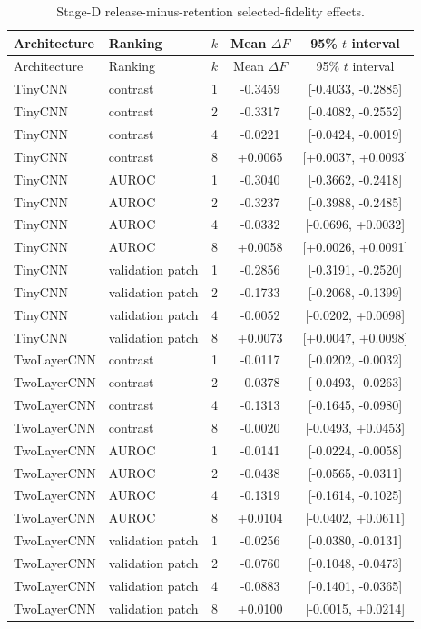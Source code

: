 {
\small
\setlength{\tabcolsep}{4pt}
\begin{longtable}{llrcc}
\caption{Stage-D release-minus-retention selected-fidelity effects.}\label{tab:stage-d-full}\\
\toprule
Architecture & Ranking & $k$ & Mean $\Delta F$ & 95\% $t$ interval \\
\midrule
\endfirsthead
\toprule
Architecture & Ranking & $k$ & Mean $\Delta F$ & 95\% $t$ interval \\
\midrule
\endhead
\bottomrule
\endfoot
TinyCNN & contrast & 1 & -0.3459 & [-0.4033, -0.2885] \\
TinyCNN & contrast & 2 & -0.3317 & [-0.4082, -0.2552] \\
TinyCNN & contrast & 4 & -0.0221 & [-0.0424, -0.0019] \\
TinyCNN & contrast & 8 & +0.0065 & [+0.0037, +0.0093] \\
TinyCNN & AUROC & 1 & -0.3040 & [-0.3662, -0.2418] \\
TinyCNN & AUROC & 2 & -0.3237 & [-0.3988, -0.2485] \\
TinyCNN & AUROC & 4 & -0.0332 & [-0.0696, +0.0032] \\
TinyCNN & AUROC & 8 & +0.0058 & [+0.0026, +0.0091] \\
TinyCNN & validation patch & 1 & -0.2856 & [-0.3191, -0.2520] \\
TinyCNN & validation patch & 2 & -0.1733 & [-0.2068, -0.1399] \\
TinyCNN & validation patch & 4 & -0.0052 & [-0.0202, +0.0098] \\
TinyCNN & validation patch & 8 & +0.0073 & [+0.0047, +0.0098] \\
TwoLayerCNN & contrast & 1 & -0.0117 & [-0.0202, -0.0032] \\
TwoLayerCNN & contrast & 2 & -0.0378 & [-0.0493, -0.0263] \\
TwoLayerCNN & contrast & 4 & -0.1313 & [-0.1645, -0.0980] \\
TwoLayerCNN & contrast & 8 & -0.0020 & [-0.0493, +0.0453] \\
TwoLayerCNN & AUROC & 1 & -0.0141 & [-0.0224, -0.0058] \\
TwoLayerCNN & AUROC & 2 & -0.0438 & [-0.0565, -0.0311] \\
TwoLayerCNN & AUROC & 4 & -0.1319 & [-0.1614, -0.1025] \\
TwoLayerCNN & AUROC & 8 & +0.0104 & [-0.0402, +0.0611] \\
TwoLayerCNN & validation patch & 1 & -0.0256 & [-0.0380, -0.0131] \\
TwoLayerCNN & validation patch & 2 & -0.0760 & [-0.1048, -0.0473] \\
TwoLayerCNN & validation patch & 4 & -0.0883 & [-0.1401, -0.0365] \\
TwoLayerCNN & validation patch & 8 & +0.0100 & [-0.0015, +0.0214] \\
\end{longtable}
\normalsize
}

